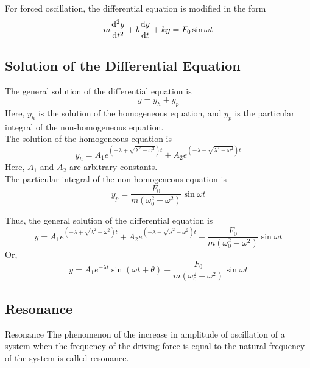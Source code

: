 \documentclass[12pt]{article}
\numberwithin{equation}{subsection}
\begin{document}
For forced oscillation, the differential equation is modified in the form
\begin{equation}
    m \dv[2]{y}{t} + b \dv{y}{t} + ky = F_0 \sin{\omega t}
\end{equation}

\subsection{Solution of the Differential Equation}
The general solution of the differential equation is
\begin{equation}
    \boxed{ y = y_h + y_p }
\end{equation}
Here, $y_h$ is the solution of the homogeneous equation, and $y_p$ is the particular integral of the non-homogeneous equation. \\
The solution of the homogeneous equation is
\begin{equation}
    \boxed{ y_h = A_1 e^{(-\lambda + \sqrt{\lambda^2 - \omega^2})t} + A_2 e^{(-\lambda - \sqrt{\lambda^2 - \omega^2})t} }
\end{equation}
Here, $A_1$ and $A_2$ are arbitrary constants. \\
The particular integral of the non-homogeneous equation is
\begin{equation}
    \boxed{ y_p = \frac{F_0}{m(\omega_0^2 - \omega^2)} \sin{\omega t} }
\end{equation}

Thus, the general solution of the differential equation is
\begin{equation}
    \boxed{ y = A_1 e^{(-\lambda + \sqrt{\lambda^2 - \omega^2})t} + A_2 e^{(-\lambda - \sqrt{\lambda^2 - \omega^2})t} + \frac{F_0}{m(\omega_0^2 - \omega^2)} \sin{\omega t} }
\end{equation}
Or,
\begin{equation}
    \boxed{ y = A_1 e^{-\lambda t} \sin{(\omega t + \theta)} + \frac{F_0}{m(\omega_0^2 - \omega^2)} \sin{\omega t} }
\end{equation}

\subsection{Resonance}
\begin{definition}{Resonance}{}
    The phenomenon of the increase in amplitude of oscillation of a system when the frequency of the driving force is equal to the natural frequency of the system is called resonance.
\end{definition}
\end{document}
